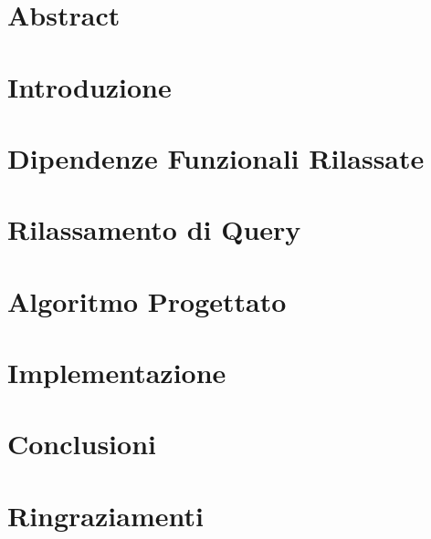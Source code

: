\documentclass[12pt,oneside]{report}
\begin{document}
\begin{titlepage}

\end{titlepage}



\chapter{Abstract}


\tableofcontents
\listoftables
\renewcommand\listoflistingscaption{Elenco degli snippet di codice}
\listoflistings



\chapter{Introduzione}


\chapter{Dipendenze Funzionali Rilassate}


\chapter{Rilassamento di Query}


\chapter{Algoritmo Progettato}


\chapter{Implementazione}


\chapter{Conclusioni}





\chapter{Ringraziamenti}

\end{document}
